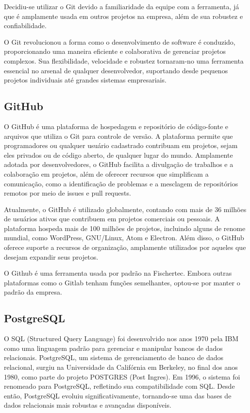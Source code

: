Decidiu-se utilizar o Git devido a familiaridade da equipe com a ferramenta, já que é amplamente usada em outros projetos na empresa, além de sua robustez e confiabilidade.
 
O Git revolucionou a forma como o desenvolvimento de software é conduzido, proporcionando uma maneira eficiente e colaborativa de gerenciar projetos complexos. Sua flexibilidade, velocidade e robustez tornaram-no uma ferramenta essencial no arsenal de qualquer desenvolvedor, suportando desde pequenos projetos individuais até grandes sistemas empresariais.

\subsection{GitHub}

O GitHub é uma plataforma de hospedagem e repositório de código-fonte e arquivos que utiliza o Git para controle de versão. A plataforma permite que programadores ou qualquer usuário cadastrado contribuam em projetos, sejam eles privados ou de código aberto, de qualquer lugar do mundo. Amplamente adotada por desenvolvedores, o GitHub facilita a divulgação de trabalhos e a colaboração em projetos, além de oferecer recursos que simplificam a comunicação, como a identificação de problemas e a mesclagem de repositórios remotos por meio de issues e pull requests.

Atualmente, o GitHub é utilizado globalmente, contando com mais de 36 milhões de usuários ativos que contribuem em projetos comerciais ou pessoais. A plataforma hospeda mais de 100 milhões de projetos, incluindo alguns de renome mundial, como WordPress, GNU/Linux, Atom e Electron. Além disso, o GitHub oferece suporte a recursos de organização, amplamente utilizados por aqueles que desejam expandir seus projetos.

O Github é uma ferramenta usada por padrão na Fischertec. Embora outras plataformas como o Gitlab tenham funções semelhantes, optou-se por manter o padrão da empresa.

\subsection{PostgreSQL}

O SQL (Structured Query Language) foi desenvolvido nos anos 1970 pela IBM como uma linguagem padrão para gerenciar e manipular bancos de dados relacionais. PostgreSQL, um sistema de gerenciamento de banco de dados relacional, surgiu na Universidade da Califórnia em Berkeley, no final dos anos 1980, como parte do projeto POSTGRES (Post Ingres). Em 1996, o sistema foi renomeado para PostgreSQL, refletindo sua compatibilidade com SQL. Desde então, PostgreSQL evoluiu significativamente, tornando-se uma das bases de dados relacionais mais robustas e avançadas disponíveis.

